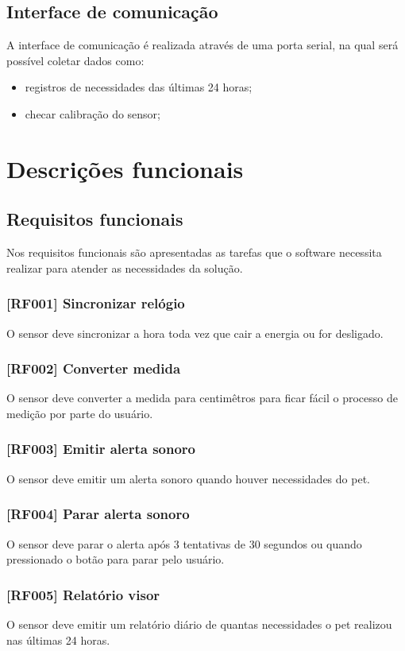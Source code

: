\documentclass[12pt,a4paper]{article}
\let\oldsection\section
\renewcommand\section{\clearpage\oldsection}
\begin{document}
\subsection{Interface de comunicação}
A interface de comunicação é realizada através de uma porta serial, na qual
será possível coletar dados como:
\begin{itemize}
	\item registros de necessidades das últimas 24 horas;
	\item checar calibração do sensor;
\end{itemize}

\section{Descrições funcionais}

\subsection{Requisitos funcionais}
Nos requisitos funcionais são apresentadas as tarefas que o software necessita
realizar para atender as necessidades da solução.

\subsubsection{[RF001] Sincronizar relógio}
O sensor deve sincronizar a hora toda vez que cair a energia ou for
desligado.

\subsubsection{[RF002] Converter medida}
O sensor deve converter a medida para centimêtros para ficar fácil o
processo de medição por parte do usuário.

\subsubsection{[RF003] Emitir alerta sonoro}
O sensor deve emitir um alerta sonoro quando houver necessidades do pet.

\subsubsection{[RF004] Parar alerta sonoro}
O sensor deve parar o alerta após 3 tentativas de 30 segundos ou quando
pressionado o botão para parar pelo usuário.

\subsubsection{[RF005] Relatório visor}
O sensor deve emitir um relatório diário de quantas necessidades o pet
realizou nas últimas 24 horas.
\end{document}
